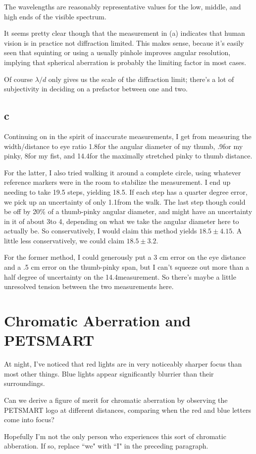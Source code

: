 \documentclass[12pt]{article}
\begin{document}
The wavelengths are reasonably representative values for the low, middle, and high ends of the visible spectrum.


It seems pretty clear though that the measurement in (a) indicates that human vision is in practice not diffraction limited. This makes sense, becaue it's easily seen that squinting or using a usually pinhole improves angular resolution, implying that spherical aberration is probably the limiting factor in most cases.


Of course \(\lambda/d\) only gives us the scale of the diffraction limit; there's a lot of subjectivity in deciding on a prefactor between one and two.

\subsection{c}

Continuing on in the spirit of inaccurate measurements, I get from measuring the width/distance to eye ratio 1.8\degree for the angular diameter of my thumb, .9\degree for my pinky, 8\degree for my fist, and 14.4\degree for the maximally stretched pinky to thumb distance.

For the latter, I also tried walking it around a complete circle, using whatever reference markers were in the room to stabilize the measurement. I end up needing to take 19.5 steps, yielding 18.5\degree. If each step has a quarter degree error, we pick up an uncertainty of only 1.1\degree from the walk. The last step though could be off by 20\% of a thumb-pinky angular diameter, and might have an uncertainty in it of about 3\degree to 4\degree, depending on what we take the angular diameter here to actually be. So conservatively, I would claim this method yields \(18.5\pm 4.15\)\degree. A little less conservatively, we could claim \(18.5\pm 3.2\)\degree. 

For the former method, I could generously put a 3 cm error on the eye distance and a .5 cm error on the thumb-pinky span, but I can't squeeze out more than a half degree of uncertainty on the 14.4\degree measurement. So there's maybe a little unresolved tension between the two measurements here.

\section{Chromatic Aberration and PETSMART}

At night, I've noticed that red lights are in very noticeably sharper focus than most other things. Blue lights appear significantly blurrier than their surroundings.

Can we derive a figure of merit for chromatic aberration by observing the PETSMART logo at different distances, comparing when the red and blue letters come into focus?

Hopefully I'm not the only person who experiences this sort of chromatic abberation. If so, replace ``we" with ``I" in the preceding paragraph.
\end{document}
